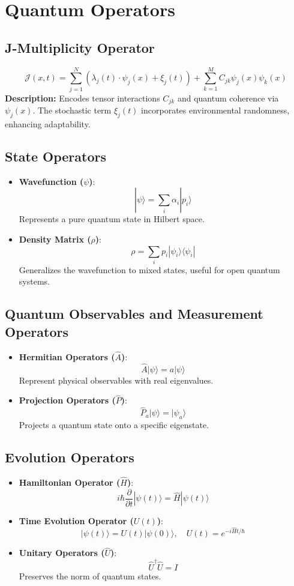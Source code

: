 \documentclass{article}
\theoremstyle{plain}
\begin{document}
\section{Quantum Operators}
\subsection{J-Multiplicity Operator}
\[
\mathcal{J}(x, t) = \sum_{j=1}^N \left( \lambda_j(t) \cdot \psi_j(x) + \xi_j(t) \right) + \sum_{k=1}^M C_{jk} \psi_j(x) \psi_k(x)
\]
\textbf{Description:} Encodes tensor interactions $C_{jk}$ and quantum coherence via $\psi_j(x)$. The stochastic term $\xi_j(t)$ incorporates environmental randomness, enhancing adaptability.
\subsection{State Operators}
\begin{itemize}
    \item \textbf{Wavefunction (\(\psi\))}:
    \[
    |\psi\rangle = \sum_i \alpha_i |p_i\rangle
    \]
    Represents a pure quantum state in Hilbert space.
    
    \item \textbf{Density Matrix (\(\rho\))}:
    \[
    \rho = \sum_i p_i |\psi_i\rangle \langle \psi_i|
    \]
    Generalizes the wavefunction to mixed states, useful for open quantum systems.
\end{itemize}

\subsection{Quantum Observables and Measurement Operators}
\begin{itemize}
    \item \textbf{Hermitian Operators (\(\hat{A}\))}:
    \[
    \hat{A} |\psi\rangle = a |\psi\rangle
    \]
    Represent physical observables with real eigenvalues.

    \item \textbf{Projection Operators (\(\hat{P}\))}:
    \[
    \hat{P}_a |\psi\rangle = |\psi_a\rangle
    \]
    Projects a quantum state onto a specific eigenstate.
\end{itemize}

\subsection{Evolution Operators}
\begin{itemize}
    \item \textbf{Hamiltonian Operator (\(\hat{H}\))}:
    \[
    i\hbar \frac{\partial}{\partial t} |\psi(t)\rangle = \hat{H} |\psi(t)\rangle
    \]

    \item \textbf{Time Evolution Operator (\(U(t)\))}:
    \[
    |\psi(t)\rangle = U(t) |\psi(0)\rangle, \quad U(t) = e^{-i \hat{H} t / \hbar}
    \]

    \item \textbf{Unitary Operators (\(\hat{U}\))}:
    \[
    \hat{U}^\dagger \hat{U} = I
    \]
    Preserves the norm of quantum states.
\end{itemize}
\end{document}
